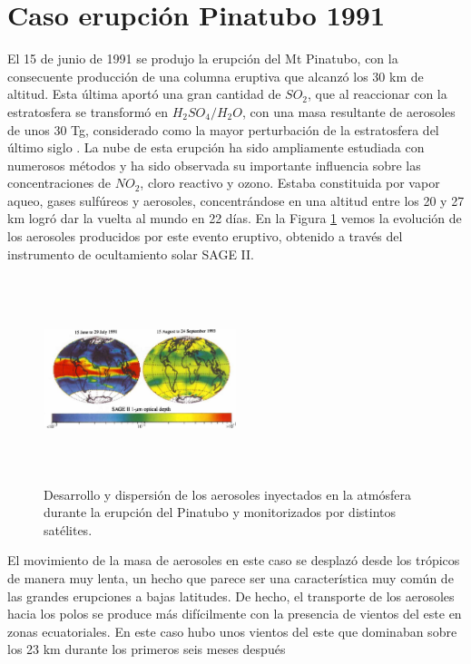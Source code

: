 \documentclass[a4apaper,twocolumn,10pt]{article}
\begin{document}
\section{Caso erupci\'on Pinatubo 1991}
El 15 de junio de 1991 se produjo la erupci\'on del Mt Pinatubo, con la consecuente
producci\'on de una columna eruptiva que alcanz\'o los 30 km de altitud. Esta \'ultima aport\'o una gran cantidad de $SO_{2}$, que al reaccionar con la estratosfera se transform\'o en $H_{2}SO_{4}/H_{2}O$, con una
masa resultante de aerosoles de unos 30 Tg, considerado como la mayor perturbaci\'on de la estratosfera del \'ultimo siglo \cite{mccormick1995atmospheric}. La nube de esta erupci\'on ha sido ampliamente estudiada con numerosos m\'etodos y ha sido observada su importante influencia sobre las concentraciones de $NO_{2}$, cloro reactivo y ozono. Estaba constituida por vapor aqueo,
gases sulf\'ureos y aerosoles, concentr\'andose en una altitud entre los 20 y 27 km logr\'o dar la vuelta al mundo en 22 d\'ias. En la Figura \ref{fig:Figura2} vemos la evoluci\'on de los aerosoles producidos por este evento eruptivo, obtenido a trav\'es del instrumento de ocultamiento solar SAGE II.
\begin{figure}[t]
\begin{center}
  \includegraphics[width=0.5\textwidth,height=6cm]{Figura2}
  \end{center}
  \caption{Desarrollo y dispersi\'on de los aerosoles inyectados en la atm\'osfera durante la erupci\'on del Pinatubo y monitorizados por distintos sat\'elites.}
  \label{fig:Figura2}
\end{figure}
El movimiento de la masa de aerosoles en este caso se desplaz\'o desde los tr\'opicos de
manera muy lenta, un hecho que parece ser una caracter\'istica muy com\'un de las grandes erupciones a bajas latitudes. De hecho, el transporte de los aerosoles hacia los polos se produce m\'as dif\'icilmente con la presencia de vientos del este en zonas ecuatoriales. En este caso hubo unos vientos del este que dominaban sobre los 23 km durante los primeros seis meses despu\'es
\end{document}
